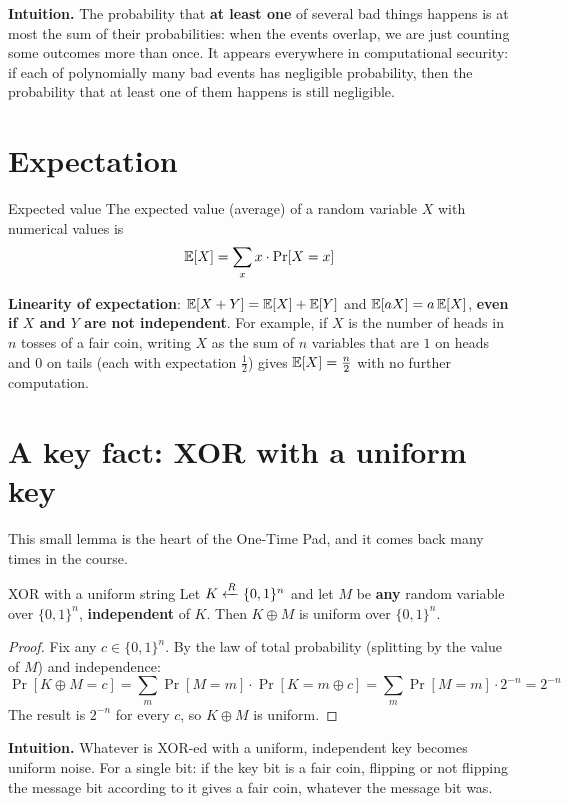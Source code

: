 \textbf{Intuition.} The probability that \textbf{at least one} of several bad things happens is at most the sum of their probabilities: when the events overlap, we are just counting some outcomes more than once. It appears everywhere in computational security: if each of polynomially many bad events has negligible probability, then the probability that at least one of them happens is still negligible.

\section{Expectation}

\begin{frameddefn}{Expected value}
  The expected value (average) of a random variable $X$ with numerical values is
  \[
    \mathbb{E}[X] = \sum_{x} x \cdot \Pr[X = x]
  \]
\end{frameddefn}

\textbf{Linearity of expectation}: $\mathbb{E}[X + Y] = \mathbb{E}[X] + \mathbb{E}[Y]$ and $\mathbb{E}[aX] = a\,\mathbb{E}[X]$, \textbf{even if $X$ and $Y$ are not independent}. For example, if $X$ is the number of heads in $n$ tosses of a fair coin, writing $X$ as the sum of $n$ variables that are $1$ on heads and $0$ on tails (each with expectation $\frac{1}{2}$) gives $\mathbb{E}[X] = \frac{n}{2}$ with no further computation.

\section{A key fact: XOR with a uniform key}

This small lemma is the heart of the One-Time Pad, and it comes back many times in the course.

\begin{framedlem}{XOR with a uniform string}
  Let $K \xleftarrow{R} \{0,1\}^n$ and let $M$ be \textbf{any} random variable over $\{0,1\}^n$, \textbf{independent} of $K$. Then $K \oplus M$ is uniform over $\{0,1\}^n$.
\end{framedlem}

\begin{proof}
  Fix any $c \in \{0,1\}^n$. By the law of total probability (splitting by the value of $M$) and independence:
  \[
    \Pr[K \oplus M = c] = \sum_{m} \Pr[M = m] \cdot \Pr[K = m \oplus c] = \sum_{m} \Pr[M = m] \cdot 2^{-n} = 2^{-n}
  \]
  The result is $2^{-n}$ for every $c$, so $K \oplus M$ is uniform.
\end{proof}

\textbf{Intuition.} Whatever is XOR-ed with a uniform, independent key becomes uniform noise. For a single bit: if the key bit is a fair coin, flipping or not flipping the message bit according to it gives a fair coin, whatever the message bit was.
